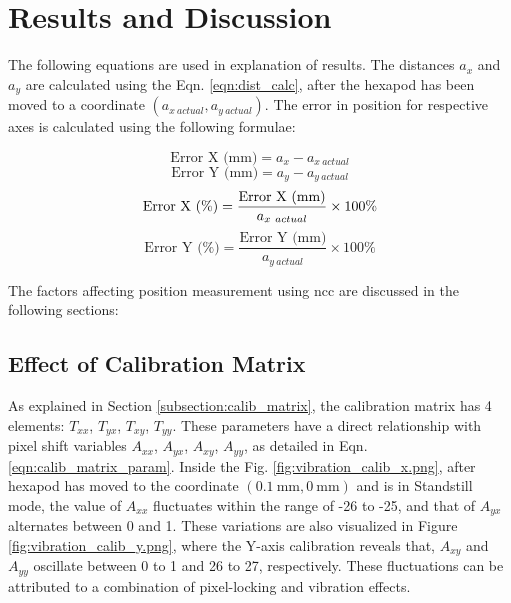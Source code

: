 \chapter{Results and Discussion} \label{chap:results_and_discussion}

The following equations are used in explanation of results. The distances $a_x$ and $a_y$ are calculated using the Eqn. \ref{eqn:dist_calc}, after the hexapod has been moved to a coordinate $(a_{x\ actual}, a_{y\ actual})$. The error in position for respective axes is calculated using the following formulae:

\begin{equation}
    \text{Error X (mm)} = a_x - a_{x\ actual}
\end{equation}
\begin{equation}
    \text{Error Y (mm)} = a_y - a_{y\ actual}
\end{equation}
\begin{equation}
    \text{Error X (\%)} = \frac{\text{Error X (mm)}}{a_{x\ actual}} \times 100\% \\
\end{equation}
\begin{equation}
    \text{Error Y (\%)} = \frac{\text{Error Y (mm)}}{a_{y\ actual}} \times 100\%
\end{equation}

\vspace{10mm}
\noindent The factors affecting position measurement using \gls{ncc} are discussed in the following sections:

\section{Effect of Calibration Matrix}
As explained in Section \ref{subsection:calib_matrix}, the calibration matrix has 4 elements: $T_{xx}$, $T_{yx}$, $T_{xy}$, $T_{yy}$. These parameters have a direct relationship with pixel shift variables $A_{xx}$, $A_{yx}$, $A_{xy}$, $A_{yy}$, as detailed in Eqn. \ref{eqn:calib_matrix_param}. Inside the Fig. \ref{fig:vibration_calib_x.png}, after hexapod has moved to the coordinate $(\SI{0.1}{\milli\meter}, \SI{0}{\milli\meter})$ and is in \textsf{Standstill} mode, the value of $A_{xx}$ fluctuates within the range of -26 to -25, and that of $A_{yx}$ alternates between 0 and 1. These variations are also visualized in Figure \ref{fig:vibration_calib_y.png}, where the Y-axis calibration reveals that, $A_{xy}$ and $A_{yy}$ oscillate between 0 to 1 and 26 to 27, respectively. These fluctuations can be attributed to a combination of pixel-locking and vibration effects.


